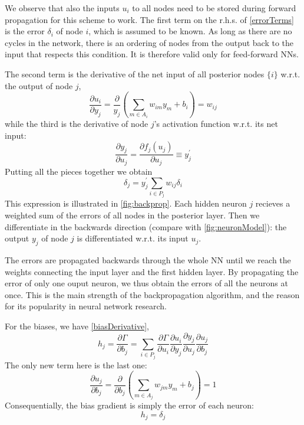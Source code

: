 \documentclass[twoside,english]{uiofysmaster}
\begin{document}
We observe that also the inputs $u_i$ to all nodes need to be stored during forward propagation for 
this scheme to work. 
The first term on the r.h.s. of \eqref{errorTerms} is the error $\delta_i$ of node $i$, which is assumed to be known. 
As long as there are no cycles in the network, there is an ordering
of nodes from the output back to the input that respects this condition. It is
therefore valid only for feed-forward NNs.

The second term is the derivative of the net input of all posterior
nodes $\{i\}$ w.r.t. the output of node $j$,
\begin{equation}
 \frac{\partial u_i}{\partial y_j} = \frac{\partial}{y_j}\left(\sum_{m\in A_i} w_{im}y_m + b_i\right) = w_{ij}
\end{equation}
while the third is the derivative of node $j$'s activation function w.r.t. its net input:
\begin{equation}
 \frac{\partial y_j}{\partial u_j} = \frac{\partial f_j(u_j)}{\partial u_j} \equiv y^\prime_j
\end{equation}
Putting all the pieces together we obtain
\begin{equation}
 \delta_j = y^\prime_j\sum_{i\in P_j}w_{ij} \delta_i 
 \label{backprop}
\end{equation}
This expression is illustrated in \autoref{fig:backprop}.  
Each hidden neuron $j$ recieves a weighted sum
of the errors of all nodes in the posterior layer. Then we differentiate in the backwards direction (compare with 
\autoref{fig:neuronModel}): 
the output $y_j$ of node $j$ is differentiated w.r.t. its input $u_j$. 

The errors are propagated backwards through the whole NN until we reach the weights connecting the input layer
and the first hidden layer. 
By propagating the error
of only one ouput neuron, we thus obtain the errors of all the neurons at once. This is the main strength of the backpropagation
algorithm, and the reason for its popularity in neural network research. 

\noindent For the biases, we have \eqref{biasDerivative},
\begin{equation}
 h_j = \frac{\partial \Gamma}{\partial b_j} = \sum_{i\in P_j} \frac{\partial \Gamma}{\partial u_i}
	      \frac{\partial u_i}{\partial y_j} \frac{\partial y_j}{\partial u_j} \frac{\partial u_j}{\partial b_j}
\end{equation}
The only new term here is the last one:
\begin{equation}
 \frac{\partial u_j}{\partial b_j} = \frac{\partial}{\partial b_j}\left(\sum_{m\in A_j} w_{jm}y_m + b_j\right) = 1
\end{equation}
Consequentially, the bias gradient is simply the error of each neuron:
\begin{equation}
 h_j = \delta_j
\end{equation}
\end{document}
